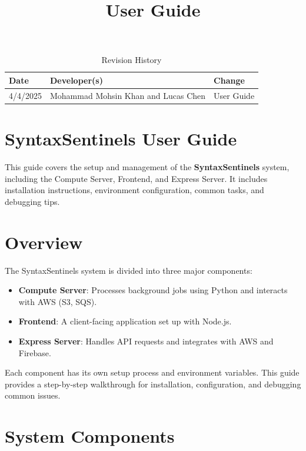 \documentclass{article}
\title{User Guide\\\progname}
\author{\authname}
\date{}
\begin{document}
\maketitle
\thispagestyle{empty}

\begin{table}[h]
\caption{Revision History} \label{TblRevisionHistory}
\begin{tabularx}{\textwidth}{llX}
\toprule
\textbf{Date} & \textbf{Developer(s)} & \textbf{Change}\\
\midrule
4/4/2025 & Mohammad Mohsin Khan and Lucas Chen & User Guide\\
\bottomrule
\end{tabularx}
\end{table}

\newpage

\section*{SyntaxSentinels User Guide}
This guide covers the setup and management of the \textbf{SyntaxSentinels} system, including the Compute Server, Frontend, and Express Server. It includes installation instructions, environment configuration, common tasks, and debugging tips.

\tableofcontents
\newpage

\section{Overview}
The SyntaxSentinels system is divided into three major components:

\begin{itemize}
    \item \textbf{Compute Server}: Processes background jobs using Python and interacts with AWS (S3, SQS).
    \item \textbf{Frontend}: A client-facing application set up with Node.js.
    \item \textbf{Express Server}: Handles API requests and integrates with AWS and Firebase.
\end{itemize}

Each component has its own setup process and environment variables. This guide provides a step-by-step walkthrough for installation, configuration, and debugging common issues.

\section{System Components}
\end{document}
